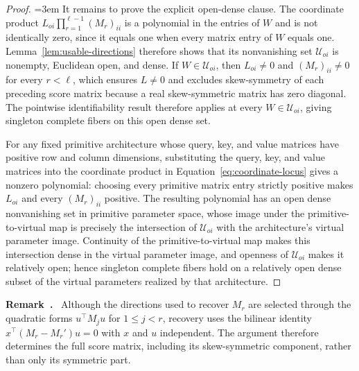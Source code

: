 \documentclass[mlmain]{jmlr}
\newcommand{\cU}{\mathcal{U}}
\newcounter{myremark}
\newenvironment{myremark}
  {\refstepcounter{myremark}%
   \par\medskip
   \noindent\textbf{Remark~\themyremark.}\ }
  {\par\medskip}
\begin{document}
\begin{proof}
\begingroup\emergencystretch=3em
It remains to prove the explicit open-dense clause.  The coordinate product
$L_{oi}\prod_{r=1}^{\ell-1}(M_r)_{ii}$ is a polynomial in the entries of
$W$ and is not identically zero, since it equals one when every matrix
entry of $W$ equals one.  Lemma~\ref{lem:usable-directions} therefore shows
that its nonvanishing set $\cU_{oi}$ is nonempty, Euclidean open, and dense.
If $W\in\cU_{oi}$, then $L_{oi}\ne0$
and $(M_r)_{ii}\ne0$ for every $r<\ell$, which ensures $L\ne0$ and excludes
skew-symmetry of each preceding score matrix because a real skew-symmetric
matrix has zero diagonal.  The pointwise identifiability result therefore
applies at every $W\in\cU_{oi}$, giving singleton complete fibers on this
open dense set.\par\endgroup

For any fixed primitive architecture whose query, key, and value matrices
have positive row and column dimensions,
substituting the query, key, and value matrices into the coordinate product
in Equation~\eqref{eq:coordinate-locus} gives a nonzero polynomial:
choosing every primitive matrix entry strictly positive makes $L_{oi}$ and
every $(M_r)_{ii}$ positive.  The resulting polynomial has an open dense
nonvanishing set in primitive parameter space, whose image under the
primitive-to-virtual map is precisely the intersection of $\cU_{oi}$ with
the architecture's virtual parameter image.  Continuity of the
primitive-to-virtual map makes this intersection dense in the virtual
parameter image, and openness of $\cU_{oi}$ makes it relatively open;
hence singleton complete fibers hold on a relatively open dense subset of
the virtual parameters realized by that architecture.
\end{proof}

\begin{myremark}
Although the directions used to recover $M_r$ are selected through the quadratic
forms $u^\top M_j u$ for $1\le j<r$, recovery uses the bilinear identity
$x^\top(M_r-M_r')u=0$ with $x$ and $u$ independent.  The argument therefore
determines the full score matrix, including its skew-symmetric component,
rather than only its symmetric part.
\end{myremark}
\end{document}
